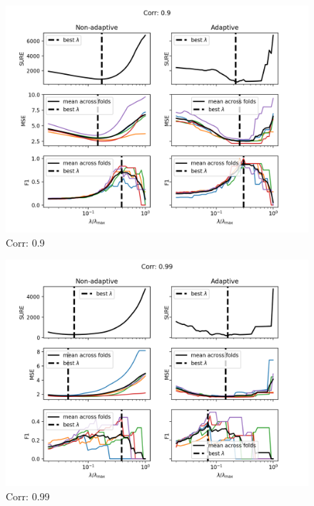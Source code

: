 \begin{figure}[h]
    \centering
    \includegraphics[]{../srcimages/sure_vs_mse_corr_90.png}
    \caption{Corr: 0.9}
    \label{fig:sure_vs_mse_corr_90}
\end{figure}

\begin{figure}[h]
    \centering
    \includegraphics[]{../srcimages/sure_vs_mse_corr_99.png}
    \caption{Corr: 0.99}
    \label{fig:sure_vs_mse_corr_99}
\end{figure}
